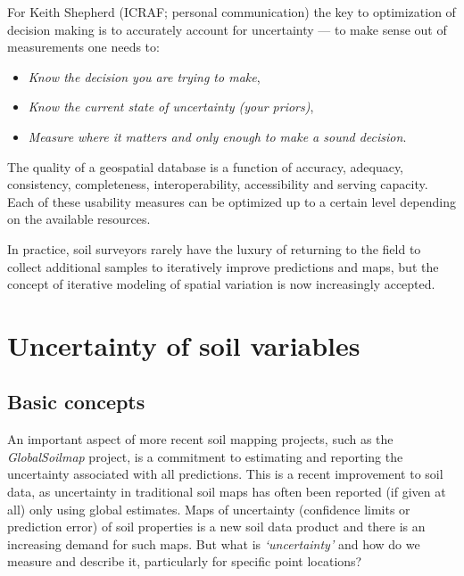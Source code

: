 \documentclass[graybox,natbib,nospthms,UStrade]{svmono}
\let\BeginKnitrBlock\begin \let\EndKnitrBlock\end
\let\BeginKnitrBlock\begin \let\EndKnitrBlock\end
\begin{document}
For Keith Shepherd (ICRAF; personal communication) the key to
optimization of decision making is to accurately account for uncertainty
--- to make sense out of measurements one needs to:

\begin{itemize}
\item
  \emph{Know the decision you are trying to make},
\item
  \emph{Know the current state of uncertainty (your priors)},
\item
  \emph{Measure where it matters and only enough to make a sound decision}.
\end{itemize}

\BeginKnitrBlock{rmdnote}
The quality of a geospatial database is a function
of accuracy, adequacy, consistency, completeness, interoperability,
accessibility and serving capacity. Each of these usability measures can
be optimized up to a certain level depending on the available resources.
\EndKnitrBlock{rmdnote}

In practice, soil surveyors rarely have the luxury of returning to the
field to collect additional samples to iteratively improve predictions and
maps, but the concept of iterative modeling of spatial variation is now
increasingly accepted.

\hypertarget{uncertainty-soil-variables}{%
\section{Uncertainty of soil variables}\label{uncertainty-soil-variables}}

\hypertarget{basic-concepts}{%
\subsection{Basic concepts}\label{basic-concepts}}

An important aspect of more recent soil mapping projects, such as the
\emph{GlobalSoilmap} project, is a commitment to estimating and reporting the
uncertainty associated with all predictions. This is a recent
improvement to soil data, as uncertainty in traditional soil maps has
often been reported (if given at all) only using global estimates.
Maps of uncertainty (confidence limits or prediction error) of soil
properties is a new soil data product and there is an increasing demand
for such maps. But what is \emph{`uncertainty'} and how do we measure and
describe it, particularly for specific point locations?
\end{document}
